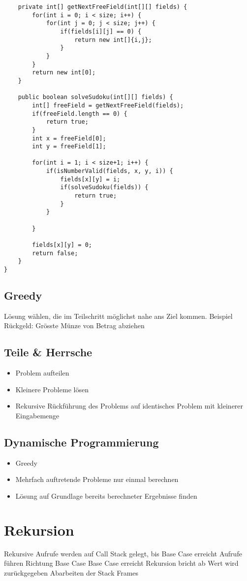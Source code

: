 \begin{multicols*}{4}
\begin{lstlisting}
	private int[] getNextFreeField(int[][] fields) { 
		for(int i = 0; i < size; i++) { 
			for(int j = 0; j < size; j++) { 
				if(fields[i][j] == 0) { 
					return new int[]{i,j}; 
				} 
			} 
		} 
		return new int[0]; 
	} 
	
	public boolean solveSudoku(int[][] fields) { 
		int[] freeField = getNextFreeField(fields); 
		if(freeField.length == 0) { 
			return true; 
		} 
		int x = freeField[0]; 
		int y = freeField[1]; 
		
		for(int i = 1; i < size+1; i++) { 
			if(isNumberValid(fields, x, y, i)) { 
				fields[x][y] = i; 
				if(solveSudoku(fields)) { 
					return true; 
				} 
			} 
			
		} 

		fields[x][y] = 0; 
		return false; 
	} 
} 
			\end{lstlisting}

	\subsection{Greedy}
	Lösung wählen, die im Teilschritt möglichst nahe ans Ziel kommen.
	Beispiel Rückgeld: Grösste Münze von Betrag abziehen

	\subsection{Teile \& Herrsche}
		\begin{itemize}
			\item Problem aufteilen
			\item Kleinere Probleme lösen
			\item Rekursive Rückführung des Problems auf identisches Problem mit kleinerer Eingabemenge
		\end{itemize}
	
	\subsection{Dynamische Programmierung}
		\begin{itemize}
			\item Greedy
			\item Mehrfach auftretende Probleme nur einmal berechnen
			\item Lösung auf Grundlage bereits berechneter Ergebnisse finden
		\end{itemize}

\section{Rekursion}
	\begin{outline}
		\1 Rekursive Aufrufe werden auf Call Stack gelegt, bis Base Case erreicht
		\2 Aufrufe führen Richtung Base Case
		\1 Base Case erreicht
		\2 Rekursion bricht ab
		\2 Wert wird zurückgegeben
		\2 Abarbeiten der Stack Frames
	\end{outline}


\end{multicols*}
